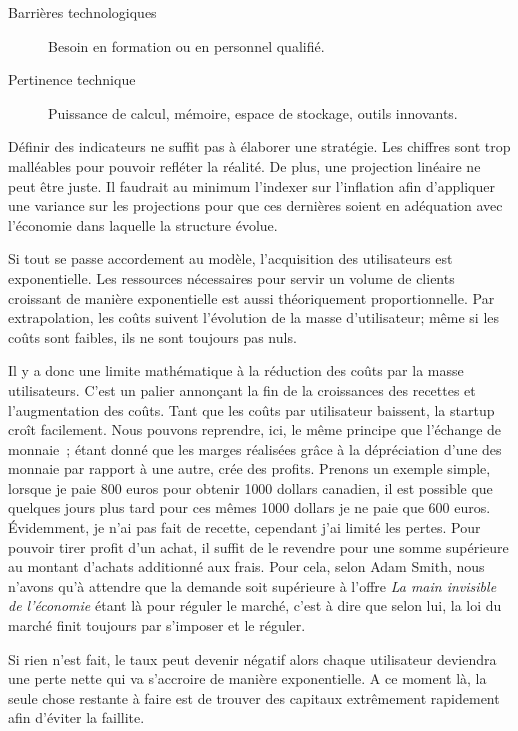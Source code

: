 \documentclass[11pt, a4paper ]{article}
\begin{document}
\begin{spacing}{1.5}
\begin{description}
	\item[Barrières technologiques]
		Besoin en formation ou en personnel qualifié.

	\item[Pertinence technique]
		Puissance de calcul, mémoire, espace de stockage, outils innovants.

\end{description}

Définir des indicateurs ne suffit pas à élaborer une stratégie. Les chiffres sont trop malléables pour pouvoir refléter la réalité. De plus, une projection linéaire ne peut être juste. Il faudrait au minimum l'indexer sur l'inflation afin d'appliquer une variance sur les projections pour que ces dernières soient en adéquation avec l'économie dans laquelle la structure évolue.


Si tout se passe accordement au modèle, l’acquisition des utilisateurs est exponentielle. Les ressources nécessaires pour servir un volume de clients croissant de manière exponentielle est aussi théoriquement proportionnelle. Par extrapolation, les coûts suivent l’évolution de la masse d'utilisateur; même si les coûts sont faibles, ils ne sont toujours pas nuls.

Il y a donc une limite mathématique à la réduction des coûts par la masse utilisateurs. C'est un palier annonçant la fin de la croissances des recettes et l'augmentation des coûts. Tant que les coûts par utilisateur baissent, la startup croît facilement. Nous pouvons reprendre, ici, le même principe que l’échange de monnaie ; étant donné que les marges réalisées grâce à la dépréciation d'une des monnaie par rapport à une autre, crée des profits.
Prenons un exemple simple, lorsque je paie 800 euros pour obtenir 1000 dollars canadien, il est possible que quelques jours plus tard pour ces mêmes 1000 dollars je ne paie que 600 euros. Évidemment, je n'ai pas fait de recette, cependant j'ai limité les pertes. Pour pouvoir tirer profit d'un achat, il suffit de le revendre pour une somme supérieure au montant d'achats additionné aux frais.
Pour cela, selon Adam Smith, nous n'avons qu'à attendre que la demande soit supérieure à l'offre \emph{La main invisible de l'économie} étant là pour réguler le marché, c'est à dire que selon lui, la loi du marché finit toujours par s'imposer et le réguler.

Si rien n'est fait, le taux peut devenir négatif alors chaque utilisateur deviendra une perte nette qui va s’accroire de manière exponentielle. A ce moment là, la seule chose restante à faire est de trouver des capitaux extrêmement rapidement afin d'éviter la faillite.


\end{spacing}
\end{document}
